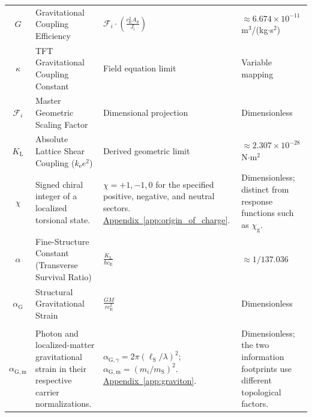 \begin{longtable}{@{} c p{5.5cm} p{4cm} p{3.5cm} @{}}
$G$ & Gravitational Coupling Efficiency & $\mathcal{F}_i \cdot \left(\frac{c_{\mathrm{E}}^2 A_{\mathrm{S}}}{J_i}\right)$ & $\approx 6.674 \times 10^{-11}$ m$^3$/(kg$\cdot$s$^2$) \\

$\kappa$ & TFT Gravitational Coupling Constant & Field equation limit & Variable mapping \\

$\mathcal{F}_i$ & Master Geometric Scaling Factor & Dimensional projection & Dimensionless \\

$K_{\mathrm{L}}$ & Absolute Lattice Shear Coupling ($k_{\mathrm{e}} e^2$) & Derived geometric limit & $\approx 2.307 \times 10^{-28}$ N$\cdot$m$^2$ \\

$\chi$ & {\raggedright Signed chiral integer of a localized torsional state.\par} & {\raggedright $\chi=+1,-1,0$ for the specified positive, negative, and neutral sectors. \newline \hyperref[app:origin_of_charge]{Appendix~\ref*{app:origin_of_charge}}.\par} & {\raggedright Dimensionless; distinct from response functions such as $\chi_{\mathrm g}$.\par} \\


$\alpha$ & Fine-Structure Constant (Transverse Survival Ratio) & $\frac{K_{\mathrm{L}}}{\hbar c_{\mathrm{E}}}$ & $\approx 1/137.036$ \\

$\alpha_{\mathrm{G}}$ & Structural Gravitational Strain & $\frac{GM}{r c_{\mathrm{E}}^2}$ & Dimensionless \\

\begin{tabular}[c]{@{}c@{}}$\alpha_{\mathrm G,\gamma}$ \\ $\alpha_{\mathrm G,\mathrm m}$\end{tabular} & {\raggedright Photon and localized-matter gravitational strain in their respective carrier normalizations.\par} & {\raggedright $\alpha_{\mathrm G,\gamma}=2\pi(\ell_{\mathrm S}/\lambda)^2$; $\alpha_{\mathrm G,\mathrm m}=(m_i/m_{\mathrm S})^2$. \newline \hyperref[app:graviton]{Appendix~\ref*{app:graviton}}.\par} & {\raggedright Dimensionless; the two information footprints use different topological factors.\par} \\



\end{longtable}
